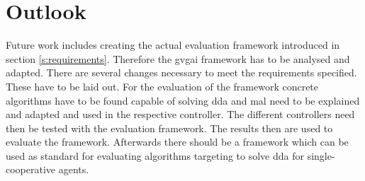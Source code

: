 \section{Outlook}\label{s:outlook}
Future work includes creating the actual evaluation framework introduced in section \ref{s:requirements}. Therefore the \ac{gvgai} framework has to be analysed and adapted. There are several changes necessary to meet the requirements specified. These have to be laid out.
For the evaluation of the framework concrete algorithms have to be found capable of solving \ac{dda} and \ac{mal} need to be explained and adapted and used in the respective controller. The different controllers need then be tested with the evaluation framework.
The results then are used to evaluate the framework. Afterwards there should be a framework which can be used as standard for evaluating algorithms targeting to solve \ac{dda} for single-cooperative agents.